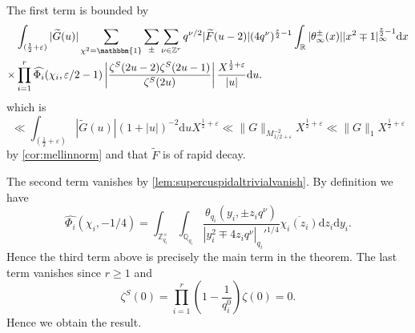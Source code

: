 \documentclass[10pt,oneside,reqno]{amsart}
\makeatletter
\newcommand\rmd{\mathrm{d}}
\newcommand\QQ{\mathbb{Q}}
\newcommand\RR{\mathbb{R}}
\newcommand\ZZ{\mathbb{Z}}
\newcommand\triv{\mathbbm{1}}
\renewcommand\geq{\geqslant}
\theoremstyle{THEOREM}
\theoremstyle{DEFINITION}
\theoremstyle{EXERCISE}
\numberwithin{equation}{section}
\renewenvironment{proof}[1][\proofname]{\par
  \vspace{-6pt}
  \pushQED{\qed}
  \normalfont \topsep6\p@\@plus6\p@\relax
  \trivlist
  \item[\hskip\labelsep\rmfamily\bfseries
    #1\@addpunct{:}]\ignorespaces
}{
  \popQED\endtrivlist\@endpefalse
  \vspace{-6pt}
}
\makeatother
\begin{document}
\begin{proof}
The first term is bounded by
\begin{align*}
&\int_{(\frac12+\varepsilon)}|\widetilde{G}(u)|\sum_{\chi^2=\triv}\sum_{\pm}\sum_{\nu\in \ZZ^r}q^{\nu/2}|\widetilde{F}(u-2)|(4q^\nu)^{\frac {\varepsilon}{2}-1}\int_{\RR}|\theta_\infty^\pm(x)||x^2\mp 1|_\infty^{\frac{\varepsilon}{2}-1}\rmd x\\
\times&\prod_{i=1}^{r}\widehat{\Phi_i}(\chi_i,\varepsilon/2-1) \left|\frac{\zeta^S(2u-2)\zeta^S(2u-1)}{\zeta^S(2u)}\right|\frac{X^{\frac12+\varepsilon}}{|u|}\rmd u. 
\end{align*}
which is 
\[
\ll \int_{(\frac12+\varepsilon)}|\widetilde{G}(u)|(1+|u|)^{-2}\rmd u X^{\frac12+\varepsilon}\ll \|G\|_{M_{1/2+\varepsilon}^{-2}}X^{\frac12+\varepsilon}\ll \|G\|_1X^{\frac12+\varepsilon}
\]
by \autoref{cor:mellinnorm} and that $\widetilde{F}$ is of rapid decay.

The second term vanishes by \autoref{lem:supercuspidaltrivialvanish}. By definition we have
\[
\widehat{\Phi_i}(\chi_i,-1/4)=\int_{\ZZ_{q_i}^\times}\int_{\QQ_{q_i}}\frac{\theta_{q_i}(y_i,\pm z_i q^\nu)}{|y_i^2\mp 4z_iq^\nu|_{q_i}'^{1/4}}\overline{\chi_i(z_i)}\rmd z_i\rmd y_i.
\]
Hence the third term above is precisely the main term in the theorem.
The last term vanishes since $r\geq 1$ and
\[
\zeta^S(0)=\prod_{i=1}^{r}\left(1-\frac{1}{q_i^0}\right)\zeta(0)=0.
\]
Hence we obtain the result.
\end{proof}
\end{document}
